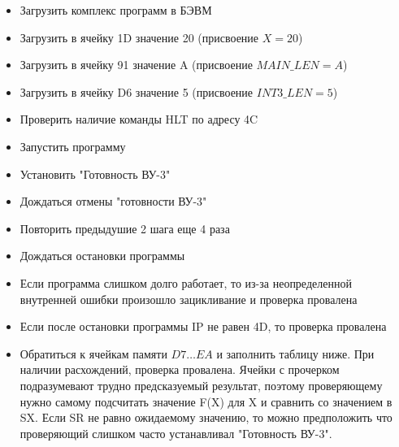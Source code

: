 \begin{itemize}
	\item Загрузить комплекс программ в БЭВМ
	\item Загрузить в ячейку 1D значение 20 (присвоение $ X = 20 $)
	\item Загрузить в ячейку 91 значение A (присвоение $ MAIN\_LEN = A $)
	\item Загрузить в ячейку D6 значение 5 (присвоение $ INT3\_LEN = 5 $)
	\item Проверить наличие команды HLT по адресу 4C
	\item Запустить программу
	\item Установить "Готовность ВУ-3"
	\item Дождаться отмены "готовности ВУ-3"
	\item Повторить предыдушие 2 шага еще 4 раза
	\item Дождаться остановки программы
	\item Если программа слишком долго работает, то из-за неопределенной внутренней ошибки произошло зацикливание и проверка провалена
	\item Если после остановки программы IP не равен 4D, то проверка провалена
	\item Обратиться к ячейкам памяти $ D7\ldots EA $ и заполнить таблицу ниже. При наличии расхождений, проверка провалена. Ячейки с прочерком подразумевают трудно предсказуемый результат, поэтому проверяющему нужно самому подсчитать значение F(X) для X и сравнить со значением в SX. Если SR не равно ожидаемому значению, то можно предположить что проверяющий слишком часто устанавливал "Готовность ВУ-3".
\end{itemize}

